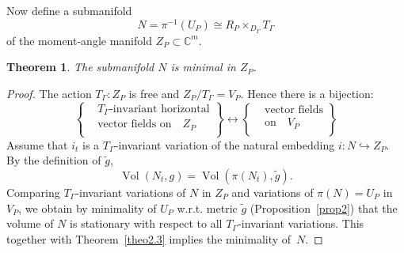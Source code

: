 \documentclass[jsg]{IP_v1_forauthors}
\def\Vol{\mathop{\mathrm{Vol}}}
\newtheorem{theo}{Theorem}[section]
\theoremstyle{definition}
\numberwithin{equation}{section}
\begin{document}
Now define a submanifold 
\begin{equation}
N= \pi ^{-1}(U_P) \cong R_P \times_{D_\Gamma} T_\Gamma  
\end{equation}
of the moment-angle manifold $Z_P \subset {\mathbb C}^m $.
\begin{theo}\label{theoA}
The submanifold $N$ is minimal in $Z_P$.
\end{theo}
\begin{proof}
The action $T_\Gamma \colon Z_P$ is free and $Z_P/T_\Gamma=V_P$. Hence there is a bijection:
\begin{equation}
\left \{
\begin{aligned}
& T_{\Gamma}  \text {-invariant horizontal} \\
&\text{vector fields on} \quad  Z_P \\
\end{aligned}
\right \}
\longleftrightarrow
\left \{
\begin{aligned}
&\text{vector fields} \\
&\text{on} \quad V_P \\
\end{aligned}
\right \}
\end{equation}
Assume that $i_t$ is a $T_\Gamma$-invariant variation of the natural embedding $i \colon N\hookrightarrow Z_P$. By the definition of $\tilde{g}$,
\begin{equation}
\Vol(N_t,g)=\Vol(\pi(N_t),\tilde{g}).
\end{equation}
Comparing $T_\Gamma$-invariant variations of $N$ in $Z_P$ and variations of $\pi(N)= U_P$ in $V_P$, we obtain by minimality of $U_P$ w.r.t. metric $\tilde{g}$ (Proposition~\ref{prop2}) that the volume of $N$ is stationary with respect to all $T_\Gamma$-invariant variations. This together with Theorem~\ref{theo2.3} implies the minimality of~$N$.
\end{proof}
\end{document}
